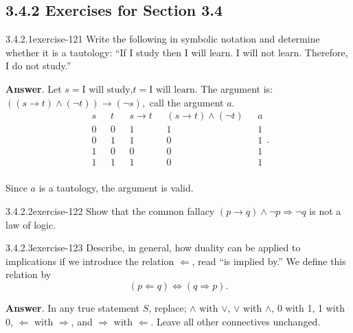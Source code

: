 \documentclass[twoside,10pt,]{book}
\numberwithin{equation}{section}
\begin{document}
\subsection*{3.4.2 Exercises for Section 3.4}
\begin{divisionsolution}{3.4.2.1}{}{exercise-121}%
\hypertarget{p-1053}{}%
Write the following in symbolic notation and determine whether it is a tautology: ``If I study then I will learn. I will not learn. Therefore, I do not study.''%
\par\smallskip%
\noindent\textbf{Answer}.\quad%
\hypertarget{p-1054}{}%
Let \(s=\textrm{I will study}\),\(t=\textrm{I will learn.}\)  The argument is: \(((s\to t)\land (\neg t))\to (\neg s) ,\) call the argument \(a\).%
\begin{equation*}
\begin{array}{ccccc}
s\text{   } & t\text{  } & s\to t\text{   } & (s\to t)\land (\neg t)\text{   } & a \\
\hline
0\text{   } & 0\text{   } & 1\text{   } & 1\text{   } & 1 \\
0\text{   } & 1\text{   } & 1\text{   } & 0\text{   } & 1 \\
1\text{   } & 0\text{   } & 0\text{   } & 0\text{   } & 1 \\
1\text{   } & 1\text{   } & 1\text{   } & 0\text{   } & 1 \\
\end{array}\text{.}
\end{equation*}
%
\par
\hypertarget{p-1055}{}%
Since \(a\) is a tautology, the argument is valid.%
\end{divisionsolution}%
\begin{divisionsolution}{3.4.2.2}{}{exercise-122}%
\hypertarget{p-1056}{}%
Show that the common fallacy \((p\to  q) \land  \neg p \Rightarrow  \neg q\) is not a law of logic.%
\end{divisionsolution}%
\begin{divisionsolution}{3.4.2.3}{}{exercise-123}%
\hypertarget{p-1057}{}%
Describe, in general, how duality can be applied to implications if we introduce the relation \(\Leftarrow\), read ``is implied by.''  We define this relation by%
\begin{equation*}
(p \Leftarrow q) \Leftrightarrow (q \Rightarrow p)\text{.}
\end{equation*}
%
\par\smallskip%
\noindent\textbf{Answer}.\quad%
\hypertarget{p-1058}{}%
In any true statement \(S\), replace; \(\land\) with \(\lor\),  \(\lor\) with \(\land\), 0 with 1, 1 with 0, \(\Leftarrow\) with \(\Rightarrow \), and \(\Rightarrow \) with \(\Leftarrow \). Leave all other connectives unchanged.%
\end{divisionsolution}%
\end{document}
